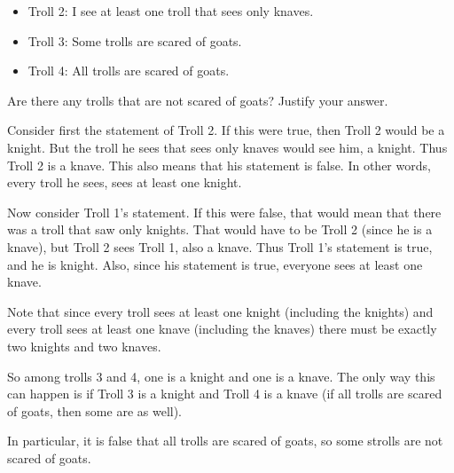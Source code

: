 \begin{questions}
\begin{itemize}
  \item[] Troll 2: I see at least one troll that sees only knaves.

  \item[] Troll 3: Some trolls are scared of goats.

  \item[] Troll 4: All trolls are scared of goats.
  \end{itemize}

  Are there any trolls that are not scared of goats?  Justify your answer.

  \begin{solution}
  Consider first the statement of Troll 2.  If this were true, then Troll 2 would be a knight.  But the troll he sees that sees only knaves would see him, a knight.  Thus Troll 2 is a knave.  This also means that his statement is false.  In other words, every troll he sees, sees at least one knight.

  Now consider Troll 1's statement.  If this were false, that would mean that there was a troll that saw only knights.  That would have to be Troll 2 (since he is a knave), but Troll 2 sees Troll 1, also a knave.  Thus Troll 1's statement is true, and he is knight.  Also, since his statement is true, everyone sees at least one knave.

  Note that since every troll sees at least one knight (including the knights) and every troll sees at least one knave (including the knaves) there must be exactly two knights and two knaves.

  So among trolls 3 and 4, one is a knight and one is a knave.  The only way this can happen is if Troll 3 is a knight and Troll 4 is a knave (if all trolls are scared of goats, then some are as well).

  In particular, it is false that all trolls are scared of goats, so some strolls are not scared of goats.


  \end{solution}

\end{questions}


